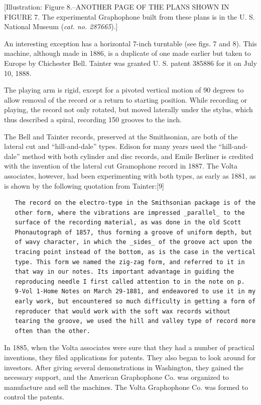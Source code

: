 \documentclass[12pt,oneside]{scrbook}
\begin{document}
  {[}Illustration: Figure 8.--ANOTHER PAGE OF THE PLANS SHOWN IN FIGURE 7.
  The experimental Graphophone built from these plans is in the U. S.
  National Museum (\emph{cat. no. 287665}).{]}
  
  An interesting exception has a horizontal 7-inch turntable (see figs. 7
  and 8). This machine, although made in 1886, is a duplicate of one made
  earlier but taken to Europe by Chichester Bell. Tainter was granted U.
  S. patent 385886 for it on July 10, 1888.
  
  The playing arm is rigid, except for a pivoted vertical motion of 90
  degrees to allow removal of the record or a return to starting position.
  While recording or playing, the record not only rotated, but moved
  laterally under the stylus, which thus described a spiral, recording 150
  grooves to the inch.
  
  The Bell and Tainter records, preserved at the Smithsonian, are both of
  the lateral cut and ``hill-and-dale'' types. Edison for many years used
  the ``hill-and-dale'' method with both cylinder and disc records, and
  Emile Berliner is credited with the invention of the lateral cut
  Gramophone record in 1887. The Volta associates, however, had been
  experimenting with both types, as early as 1881, as is shown by the
  following quotation from Tainter:{[}9{]}
  
  \begin{verbatim}
   The record on the electro-type in the Smithsonian package is of the
   other form, where the vibrations are impressed _parallel_ to the
   surface of the recording material, as was done in the old Scott
   Phonautograph of 1857, thus forming a groove of uniform depth, but
   of wavy character, in which the _sides_ of the groove act upon the
   tracing point instead of the bottom, as is the case in the vertical
   type. This form we named the zig-zag form, and referred to it in
   that way in our notes. Its important advantage in guiding the
   reproducing needle I first called attention to in the note on p.
   9-Vol 1-Home Notes on March 29-1881, and endeavored to use it in my
   early work, but encountered so much difficulty in getting a form of
   reproducer that would work with the soft wax records without
   tearing the groove, we used the hill and valley type of record more
   often than the other.
  \end{verbatim}
  
  In 1885, when the Volta associates were sure that they had a number of
  practical inventions, they filed applications for patents. They also
  began to look around for investors. After giving several demonstrations
  in Washington, they gained the necessary support, and the American
  Graphophone Co. was organized to manufacture and sell the machines. The
  Volta Graphophone Co. was formed to control the patents.
  
\end{document}
